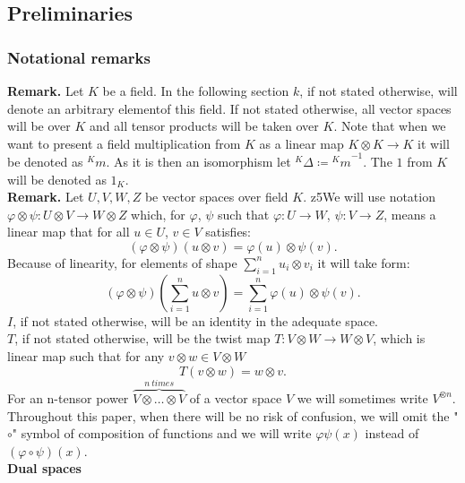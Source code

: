 \documentclass[a4paper, 12pt]{article}
\begin{document}
\subsection{Preliminaries}
\subsubsection{Notational remarks}
\indent \textbf{Remark. }Let $K$ be a field. In the following section $k$, if not stated otherwise, will
denote an arbitrary elementof this field. If not stated otherwise, all vector spaces will be over $K$
and all tensor products will be taken over $K$. Note that when we want to present a field
multiplication from $K$ as a linear map $K \otimes K \to K$ it will be denoted as ${^Km}$. As it is then an
isomorphism let ${^K\Delta} \coloneqq {^Km}^{-1}$. The $1$ from $K$ will be denoted as $1_K$.\\[8pt]
\textbf{Remark. } Let $U, V, W, Z$ be vector spaces over field $K$.
z5We will use notation
$\varphi \otimes \psi:U \otimes V \to W \otimes Z$ which, for
$\varphi$, $\psi$ such that $\varphi : U \to W$, $\psi : V \to Z$, means a linear map that
for all $u \in U$, $v \in V$ satisfies:
\begin{equation*}
(\varphi \otimes \psi)(u \otimes v) = \varphi(u) \otimes \psi(v).
\end{equation*}
Because of linearity, for elements of shape $\displaystyle\sum^n_{i=1} u_i \otimes v_i$ it will take form:
\begin{equation*}
(\varphi \otimes \psi)(\sum^n_{i = 1} u \otimes v) = \sum^n_{i = 1}\varphi(u) \otimes \psi(v).
\end{equation*}
$I$, if not stated otherwise, will be an identity in the adequate space. \\
$T$, if not stated otherwise, will
be the twist map $T:V \otimes W \to W\otimes V$, which is linear map such that for any $v \otimes w
\in V \otimes W$
\begin{equation*}
T(v \otimes w) = w\otimes v.
\end{equation*}
For an n-tensor power $\overbrace{V \otimes \dots \otimes V}^{n\ times}$  of a vector space $V$ we will
sometimes write $V^{\otimes n}$.\\
Throughout this paper, when there will be no risk
of confusion, we will omit the "$\circ$" symbol of composition of functions and we will write
$\varphi \psi (x)$ instead of $(\varphi \circ \psi)(x)$. \\
\textbf{Dual spaces} \\
\end{document}

